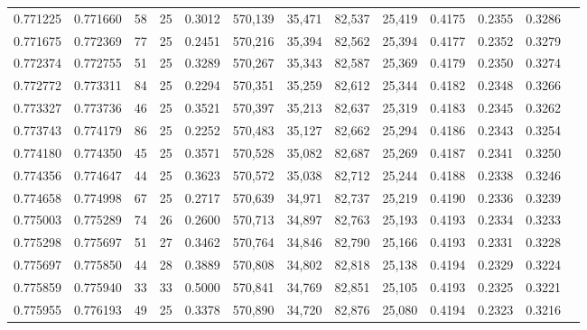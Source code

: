 \begin{tabular}{rrrrrrrrrrrrr}
0.771225 & 0.771660 &    58 &  25 &                                     0.3012 & 570,139 &  35,471 &  82,537 &  25,419 & 0.4175 & 0.2355 & 0.3286 \\
0.771675 & 0.772369 &    77 &  25 &                                     0.2451 & 570,216 &  35,394 &  82,562 &  25,394 & 0.4177 & 0.2352 & 0.3279 \\
0.772374 & 0.772755 &    51 &  25 &                                     0.3289 & 570,267 &  35,343 &  82,587 &  25,369 & 0.4179 & 0.2350 & 0.3274 \\
0.772772 & 0.773311 &    84 &  25 &                                     0.2294 & 570,351 &  35,259 &  82,612 &  25,344 & 0.4182 & 0.2348 & 0.3266 \\
0.773327 & 0.773736 &    46 &  25 &                                     0.3521 & 570,397 &  35,213 &  82,637 &  25,319 & 0.4183 & 0.2345 & 0.3262 \\
0.773743 & 0.774179 &    86 &  25 &                                     0.2252 & 570,483 &  35,127 &  82,662 &  25,294 & 0.4186 & 0.2343 & 0.3254 \\
0.774180 & 0.774350 &    45 &  25 &                                     0.3571 & 570,528 &  35,082 &  82,687 &  25,269 & 0.4187 & 0.2341 & 0.3250 \\
0.774356 & 0.774647 &    44 &  25 &                                     0.3623 & 570,572 &  35,038 &  82,712 &  25,244 & 0.4188 & 0.2338 & 0.3246 \\
0.774658 & 0.774998 &    67 &  25 &                                     0.2717 & 570,639 &  34,971 &  82,737 &  25,219 & 0.4190 & 0.2336 & 0.3239 \\
0.775003 & 0.775289 &    74 &  26 &                                     0.2600 & 570,713 &  34,897 &  82,763 &  25,193 & 0.4193 & 0.2334 & 0.3233 \\
0.775298 & 0.775697 &    51 &  27 &                                     0.3462 & 570,764 &  34,846 &  82,790 &  25,166 & 0.4193 & 0.2331 & 0.3228 \\
0.775697 & 0.775850 &    44 &  28 &                                     0.3889 & 570,808 &  34,802 &  82,818 &  25,138 & 0.4194 & 0.2329 & 0.3224 \\
0.775859 & 0.775940 &    33 &  33 &                                     0.5000 & 570,841 &  34,769 &  82,851 &  25,105 & 0.4193 & 0.2325 & 0.3221 \\
0.775955 & 0.776193 &    49 &  25 &                                     0.3378 & 570,890 &  34,720 &  82,876 &  25,080 & 0.4194 & 0.2323 & 0.3216 \\

\end{tabular}
